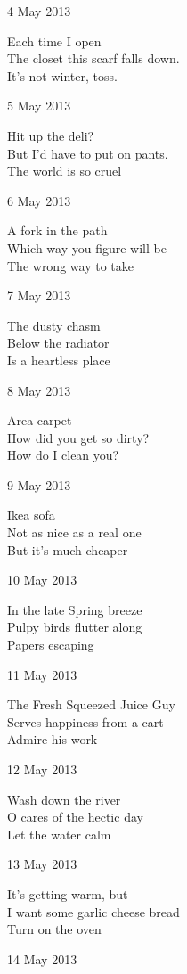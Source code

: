 \documentclass[12pt]{article}
\begin{document}
\newpage

4 May 2013

Each time I open \\
The closet this scarf falls down. \\
It's not winter, toss.

5 May 2013

Hit up the deli? \\
But I'd have to put on pants. \\
The world is so cruel

6 May 2013
 
A fork in the path \\
Which way you figure will be \\
The wrong way to take

7 May 2013

The dusty chasm \\
Below the radiator \\
Is a heartless place

8 May 2013

Area carpet \\
How did you get so dirty? \\
How do I clean you?

9 May 2013

Ikea sofa \\
Not as nice as a real one \\
But it's much cheaper

10 May 2013

In the late Spring breeze \\
Pulpy birds flutter along \\
Papers escaping

\newpage

11 May 2013

The Fresh Squeezed Juice Guy \\
Serves happiness from a cart \\
Admire his work

12 May 2013

Wash down the river \\
O cares of the hectic day \\
Let the water calm

13 May 2013

It's getting warm, but \\
I want some garlic cheese bread \\
Turn on the oven

14 May 2013
\end{document}
